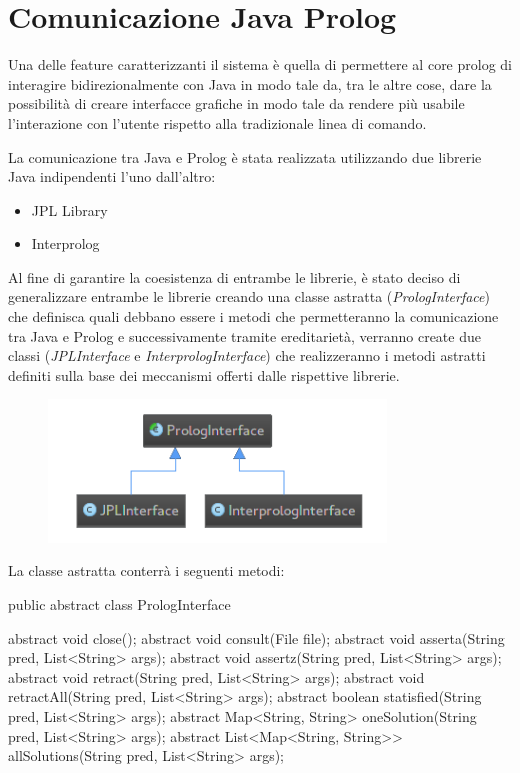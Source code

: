 
\section{Comunicazione Java Prolog}
\label{java-prolog}
Una delle feature caratterizzanti il sistema è quella di permettere al core prolog di interagire bidirezionalmente con Java in modo tale da, tra le altre cose, dare la possibilità di creare interfacce grafiche in modo tale da rendere più usabile l'interazione con l'utente rispetto alla tradizionale linea di comando.

La comunicazione tra Java e Prolog è stata realizzata utilizzando due librerie Java indipendenti l'uno dall'altro:
\begin{itemize}
	\item JPL Library
	\item Interprolog
\end{itemize}
Al fine di garantire la coesistenza di entrambe le librerie, è stato deciso di generalizzare entrambe le librerie creando una classe astratta (\emph{PrologInterface}) che definisca quali debbano essere i metodi che permetteranno la comunicazione tra Java e Prolog e successivamente tramite ereditarietà, verranno create due classi (\emph{JPLInterface} e \emph{InterprologInterface}) che realizzeranno i metodi astratti definiti sulla base dei meccanismi offerti dalle rispettive librerie.

\begin{figure}[H]
	\centering
	\includegraphics[width=0.8\textwidth]{img/prologInterface.png}
\end{figure}

La classe astratta conterrà i seguenti metodi:

\begin{javacode}
public abstract class PrologInterface {

  abstract void close();
  abstract void consult(File file);
  abstract void asserta(String pred, List<String> args);
  abstract void assertz(String pred, List<String> args);
  abstract void retract(String pred, List<String> args);
  abstract void retractAll(String pred, List<String> args);
  abstract boolean statisfied(String pred, List<String> args);
  abstract Map<String, String> oneSolution(String pred, List<String> args);
  abstract List<Map<String, String>> allSolutions(String pred, List<String> args);
}
\end{javacode}

